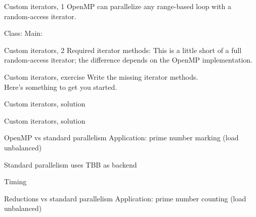 \documentclass[10pt]{beamer}
\begin{document}
\begin{numberedframe}{Custom iterators, 1}
  OpenMP can parallelize any range-based loop with a random-access iterator.
  \begin{multicols}{2}
    Class:
    \columnbreak
    Main:
  \end{multicols}
\end{numberedframe}

\begin{numberedframe}{Custom iterators, 2}
  Required iterator methods:
  This is a little short of a full random-access iterator;
  the difference depends on the OpenMP implementation.
\end{numberedframe}

\begin{numberedframe}{Custom iterators, exercise}
  Write the missing iterator methods.\\
  Here's something to get you started.
\end{numberedframe}

\begin{numberedframe}{Custom iterators, solution}
\end{numberedframe}

\begin{numberedframe}{Custom iterators, solution}
\end{numberedframe}

\begin{numberedframe}{OpenMP vs standard parallelism}
  Application: prime number marking
  (load unbalanced)


  Standard parallelism uses \ac{TBB} as backend
\end{numberedframe}

\begin{numberedframe}{Timing}
  
\end{numberedframe}

\begin{numberedframe}{Reductions vs standard parallelism}
  Application: prime number counting
  (load unbalanced)


\end{numberedframe}
\end{document}

